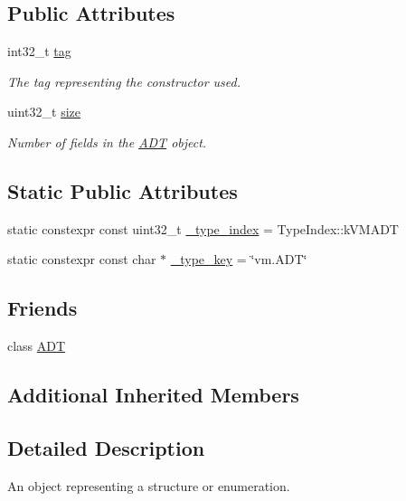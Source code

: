 \subsection*{Public Attributes}
\begin{DoxyCompactItemize}
\item 
int32\+\_\+t \hyperlink{classtvm_1_1runtime_1_1ADTObj_a8c1835b988e836dd451a343bac7e402d}{tag}
\begin{DoxyCompactList}\small\item\em The tag representing the constructor used. \end{DoxyCompactList}\item 
uint32\+\_\+t \hyperlink{classtvm_1_1runtime_1_1ADTObj_a699d898a036382a0c86fba219bcf8102}{size}
\begin{DoxyCompactList}\small\item\em Number of fields in the \hyperlink{classtvm_1_1runtime_1_1ADT}{A\+DT} object. \end{DoxyCompactList}\end{DoxyCompactItemize}
\subsection*{Static Public Attributes}
\begin{DoxyCompactItemize}
\item 
static constexpr const uint32\+\_\+t \hyperlink{classtvm_1_1runtime_1_1ADTObj_ae35ebc3d49a7264ac1ed16a80472347f}{\+\_\+type\+\_\+index} = Type\+Index\+::k\+V\+M\+A\+DT
\item 
static constexpr const char $\ast$ \hyperlink{classtvm_1_1runtime_1_1ADTObj_ab083e5c0b35f64b668eaf5cfb0f98098}{\+\_\+type\+\_\+key} = \char`\"{}vm.\+A\+DT\char`\"{}
\end{DoxyCompactItemize}
\subsection*{Friends}
\begin{DoxyCompactItemize}
\item 
class \hyperlink{classtvm_1_1runtime_1_1ADTObj_a96ef507f2261998fb326f88992b9738a}{A\+DT}
\end{DoxyCompactItemize}
\subsection*{Additional Inherited Members}


\subsection{Detailed Description}
An object representing a structure or enumeration. 

